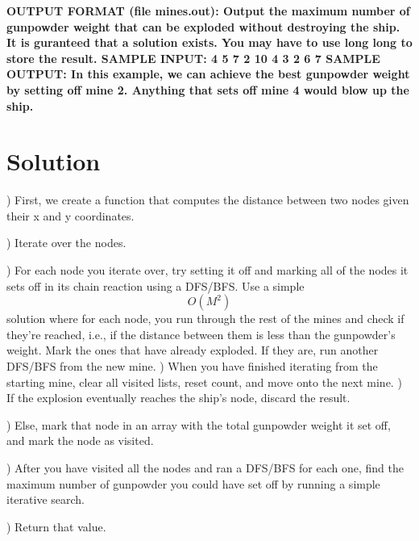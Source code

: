 \documentclass[12pt]{article}
\begin{document}
\bf \noindent \newline OUTPUT FORMAT \normalfont(file mines.out):
\newline Output the maximum number of gunpowder weight that can be exploded without destroying the ship. It is guranteed that a solution exists. You may have to use long long to store the result.
\bf \noindent \newline SAMPLE INPUT:
\normalfont
{} 4
 5
 7 2
 10 4
 3 2
 6 7
\noindent \newline \newline \bf SAMPLE OUTPUT:
\noindent \newline \newline In this example, we can achieve the best gunpowder weight by setting off mine 2. Anything that sets off mine 4 would blow up the ship.


\section{Solution}


\noindent {}) First, we create a function that computes the distance between two nodes given their x and y coordinates. 

\noindent {}) Iterate over the nodes.

\noindent {}) For each node you iterate over, try setting it off and marking all of the nodes it sets off in its chain reaction using a DFS/BFS. Use a simple \begin{equation*} O(M^2)\end{equation*}solution where for each node, you run through the rest of the mines and check if they're reached, i.e., if the distance between them is less than the gunpowder's weight. Mark the ones that have already exploded. If they are, run another DFS/BFS from the new mine.
\noindent {}) When you have finished iterating from the starting mine, clear all visited lists, reset count, and move onto the next mine.
\noindent \newline {}) If the explosion eventually reaches the ship's node, discard the result.

\noindent {}) Else, mark that node in an array with the total gunpowder weight it set off, and mark the node as visited.

\noindent {}) After you have visited all the nodes and ran a DFS/BFS for each one, find the maximum number of gunpowder you could have set off by running a simple iterative search.

\noindent {}) Return that value.
\end{document}

